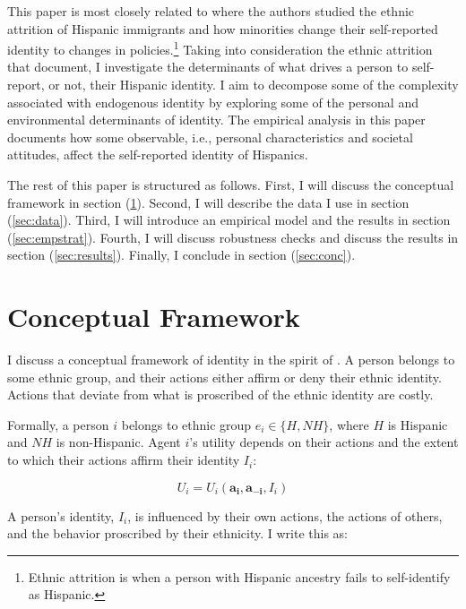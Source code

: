 \documentclass[12pt,english]{article}
\begin{document}
This paper is most closely related to \textcite{antmanEthnicAttritionObserved2016,antmanIncentivesIdentifyRacial2015,antmanAmericanIndianCasinos2021} where the authors studied the ethnic attrition of Hispanic immigrants and how minorities change their self-reported identity to changes in policies.\footnote{Ethnic attrition is when a person with Hispanic ancestry fails to self-identify as Hispanic.} Taking into consideration the ethnic attrition that \textcite{antmanEthnicAttritionObserved2016} document, I investigate the determinants of what drives a person to self-report, or not, their Hispanic identity. I aim to decompose some of the complexity associated with endogenous identity by exploring some of the personal and environmental determinants of identity. The empirical analysis in this paper documents how some observable, i.e., personal characteristics and societal attitudes, affect the self-reported identity of Hispanics. 

The rest of this paper is structured as follows. First, I will discuss the conceptual framework in section (\ref{sec:model}). Second, I will describe the data I use in section (\ref{sec:data}). Third, I will introduce an empirical model and the results in section (\ref{sec:empstrat}). Fourth, I will discuss robustness checks and discuss the results in section (\ref{sec:results}). Finally, I conclude in section (\ref{sec:conc}). 

\section{Conceptual Framework}\label{sec:model}

I discuss a conceptual framework of identity in the spirit of \textcite{akerlofEconomicsIdentity2000}. A person belongs to some ethnic group, and their actions either affirm or deny their ethnic identity. Actions that deviate from what is proscribed of the ethnic identity are costly. 

Formally, a person $i$ belongs to ethnic group $e_i \in \{H, NH\}$, where $H$ is Hispanic and $NH$ is non-Hispanic. Agent $i$'s utility depends on their actions and the extent to which their actions affirm their identity $I_i$:

\begin{equation}
U_i = U_i(\pmb{a_i}, \pmb{a_{-i}}, I_i)\label{eq:util}
\end{equation}

A person's identity, $I_i$, is influenced by their own actions, the actions of others, and the behavior proscribed by their ethnicity. I write this as:
\end{document}
